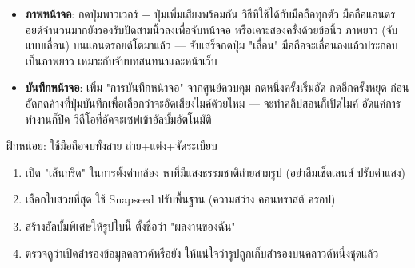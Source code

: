 
\begin{itemize}
  \item \textbf{ภาพหน้าจอ}: กดปุ่มพาวเวอร์ + ปุ่มเพิ่มเสียงพร้อมกัน วิธีที่ใช้ได้กับมือถือทุกตัว มือถือแอนดรอยด์จำนวนมากยังรองรับปัดสามนิ้วลงเพื่อจับหน้าจอ หรือเคาะสองครั้งด้วยข้อนิ้ว ภาพยาว (จับแบบเลื่อน) บนแอนดรอยด์โตมาแล้ว — จับเสร็จกดปุ่ม "เลื่อน" มือถือจะเลื่อนลงแล้วประกอบเป็นภาพยาว เหมาะกับจับบทสนทนาและหน้าเว็บ
  \item \textbf{บันทึกหน้าจอ}: เพิ่ม "การบันทึกหน้าจอ" จากศูนย์ควบคุม กดหนึ่งครั้งเริ่มอัด กดอีกครั้งหยุด ก่อนอัดกดค้างที่ปุ่มบันทึกเพื่อเลือกว่าจะอัดเสียงไมค์ด้วยไหม — จะทำคลิปสอนก็เปิดไมค์ อัดแค่การทำงานก็ปิด วิดีโอที่อัดจะเซฟเข้าอัลบั้มอัตโนมัติ
\end{itemize}

\begin{tcbpractice}{ฝึกหน่อย: ใช้มือถือจบทั้งสาย ถ่าย+แต่ง+จัดระเบียบ}
\begin{enumerate}
  \item เปิด "เส้นกริด" ในการตั้งค่ากล้อง หาที่มีแสงธรรมชาติถ่ายสามรูป (อย่าลืมเช็ดเลนส์ ปรับค่าแสง)
  \item เลือกใบสวยที่สุด ใช้ Snapseed ปรับพื้นฐาน (ความสว่าง คอนทราสต์ ครอป)
  \item สร้างอัลบั้มพิเศษให้รูปใบนี้ ตั้งชื่อว่า "ผลงานของฉัน"
  \item ตรวจดูว่าเปิดสำรองข้อมูลคลาวด์หรือยัง ให้แน่ใจว่ารูปถูกเก็บสำรองบนคลาวด์หนึ่งชุดแล้ว
\end{enumerate}

\end{tcbpractice}
